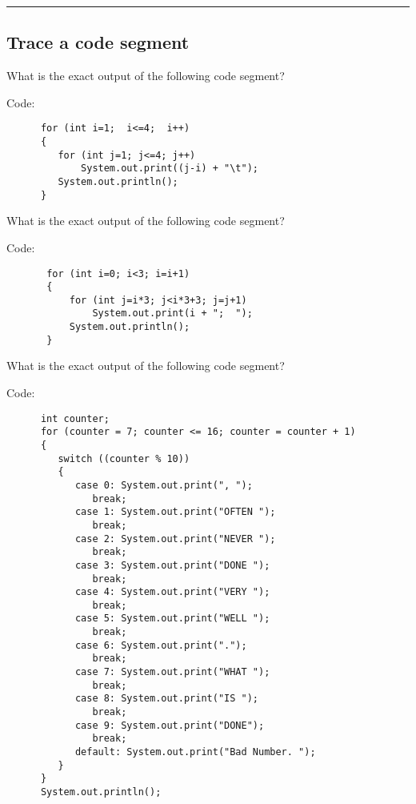 \documentclass[12pt]{exam}
\begin{document}
\noindent
\rule[2ex]{\textwidth}{2pt}
\pagebreak
\begin{questions}

\section{Trace a code segment}
\question[10] What is the exact output of the following code segment? 


 Code:
\begin{lstlisting}
      for (int i=1;  i<=4;  i++)
      {
         for (int j=1; j<=4; j++)
             System.out.print((j-i) + "\t");
         System.out.println();
      } 
\end{lstlisting}
\makeemptybox{2in}
\addpoints


\question[10] What is the exact output of the following code segment? 


 Code:
\begin{lstlisting}
       for (int i=0; i<3; i=i+1)
       {
           for (int j=i*3; j<i*3+3; j=j+1)
               System.out.print(i + ";  ");
           System.out.println();
       }
\end{lstlisting}
\makeemptybox{2in}
\addpoints

\question[10] What is the exact output of the following code segment? 


 Code:
\begin{lstlisting}
      int counter; 
      for (counter = 7; counter <= 16; counter = counter + 1)
      { 
         switch ((counter % 10))
         {
            case 0: System.out.print(", "); 
               break;
            case 1: System.out.print("OFTEN "); 
               break;
            case 2: System.out.print("NEVER "); 
               break; 
            case 3: System.out.print("DONE "); 
               break;
            case 4: System.out.print("VERY "); 
               break;
            case 5: System.out.print("WELL "); 
               break;
            case 6: System.out.print("."); 
               break;
            case 7: System.out.print("WHAT "); 
               break;
            case 8: System.out.print("IS "); 
               break;
            case 9: System.out.print("DONE"); 
               break;
            default: System.out.print("Bad Number. ");
         } 
      }
      System.out.println();

\end{lstlisting}
\makeemptybox{0.5in}
\addpoints

\end{questions}
\end{document}

